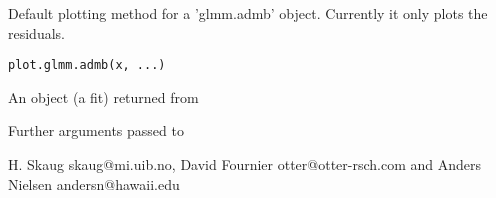 \begin{Description}\relax
Default plotting method for a 'glmm.admb' object. Currently it only plots
the residuals.
\end{Description}
\begin{Usage}
\begin{verbatim}
plot.glmm.admb(x, ...)
\end{verbatim}
\end{Usage}
\begin{Arguments}
\begin{ldescription}
\item[\code{x}] An object (a fit) returned from 
\item[\code{...}] Further arguments passed to 
\end{ldescription}
\end{Arguments}
\begin{Author}\relax
H. Skaug skaug@mi.uib.no, David Fournier otter@otter-rsch.com and 
Anders Nielsen andersn@hawaii.edu
\end{Author}
\begin{SeeAlso}\relax
{}
\end{SeeAlso}

